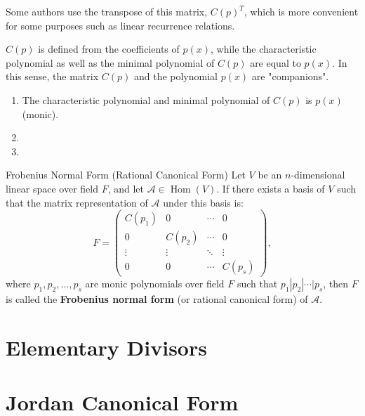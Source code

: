 \documentclass[11pt]{../../TexTemplate/elegantbook} %
\begin{document}
Some authors use the transpose of this matrix, \(C(p)^{T}\), 
which is more convenient for some purposes such as linear recurrence relations.

\(C(p)\) is defined from the coefficients of \(p(x)\), 
while the characteristic polynomial as well as the minimal polynomial of \(C(p)\) are equal to \(p(x)\). 
In this sense, the matrix \(C(p)\) and the polynomial \(p(x)\) are "companions".

\begin{property}
    \begin{enumerate}
        \item The characteristic polynomial and minimal polynomial of \( C(p) \) is \( p(x) \) (monic).
        \item  
        \item 
    \end{enumerate}
\end{property}

\begin{definition}{Frobenius Normal Form (Rational Canonical Form)}
    Let \( V \) be an \( n \)-dimensional linear space over field \( F \),
    and let \( \mathcal{A}\in \operatorname{Hom}(V) \).
    If there exists a basis of \( V \) such that the matrix representation of \( \mathcal{A} \) under this basis is:
    \[
    F = 
    \begin{pmatrix}
        C(p_1) & 0 & \cdots & 0 \\
        0 & C(p_2) & \cdots & 0 \\
        \vdots & \vdots & \ddots & \vdots \\
        0 & 0 & \cdots & C(p_s)
    \end{pmatrix},
    \]
    where \( p_1, p_2, \dots, p_s \) are monic polynomials over field \( F \) such that
    \( p_1 | p_2 | \cdots | p_s \),
    then \( F \) is called the \textbf{Frobenius normal form} (or rational canonical form) of \( \mathcal{A} \).
\end{definition}


\section{Elementary Divisors}

\section{Jordan Canonical Form}
\end{document}
